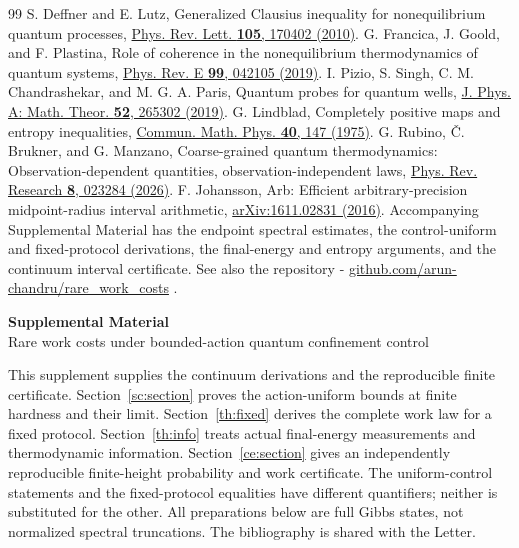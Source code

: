 \documentclass[aps,prl,reprint,superscriptaddress,longbibliography]{revtex4-2}
\begin{document}
\begin{thebibliography}{99}
S. Deffner and E. Lutz,
Generalized Clausius inequality for nonequilibrium quantum processes,
\href{https://doi.org/10.1103/PhysRevLett.105.170402}{Phys. Rev. Lett. \textbf{105}, 170402 (2010)}.
G. Francica, J. Goold, and F. Plastina,
Role of coherence in the nonequilibrium thermodynamics of quantum systems,
\href{https://doi.org/10.1103/PhysRevE.99.042105}{Phys. Rev. E \textbf{99}, 042105 (2019)}.
I. Pizio, S. Singh, C. M. Chandrashekar, and M. G. A. Paris,
Quantum probes for quantum wells,
\href{https://doi.org/10.1088/1751-8121/ab1eda}{J. Phys. A: Math. Theor. \textbf{52}, 265302 (2019)}.
G. Lindblad,
Completely positive maps and entropy inequalities,
\href{https://doi.org/10.1007/BF01609396}{Commun. Math. Phys. \textbf{40}, 147 (1975)}.
G. Rubino, \v C. Brukner, and G. Manzano,
Coarse-grained quantum thermodynamics: Observation-dependent quantities, observation-independent laws,
\href{https://doi.org/10.1103/gcyn-18tv}{Phys. Rev. Research \textbf{8}, 023284 (2026)}.
F. Johansson,
Arb: Efficient arbitrary-precision midpoint-radius interval arithmetic,
\href{https://arxiv.org/abs/1611.02831}{arXiv:1611.02831 (2016)}.
Accompanying Supplemental Material has the endpoint spectral estimates, the control-uniform and fixed-protocol derivations, the final-energy and entropy arguments, and the continuum interval certificate. See also the repository - 
\href{https://github.com/arun-chandru/rare_work_costs}{github.com/arun-chandru/rare\_work\_costs}
.
\end{thebibliography}


\clearpage
\onecolumngrid
\setcounter{section}{0}
\setcounter{equation}{0}
\renewcommand{\thesection}{S\arabic{section}}
\renewcommand{\thesubsection}{\thesection.\arabic{subsection}}
\renewcommand{\theequation}{S\arabic{section}.\arabic{equation}}
\setcounter{secnumdepth}{2}
\setlength{\emergencystretch}{2em}
\begin{center}
{\large\bfseries Supplemental Material}\\[5pt]
{\large Rare work costs under bounded-action quantum confinement control}
\end{center}
\bigskip
\noindent

This supplement supplies the continuum derivations and the reproducible
finite certificate. Section~\ref{sc:section} proves the action-uniform
bounds at finite hardness and their limit. Section~\ref{th:fixed}
derives the complete work law for a fixed protocol.
Section~\ref{th:info} treats actual final-energy measurements and
thermodynamic information. Section~\ref{ce:section} gives an independently
reproducible finite-height probability and work certificate.
The uniform-control statements and the fixed-protocol equalities have
different quantifiers; neither is substituted for the other.
All preparations below are full Gibbs states, not normalized spectral
truncations. The bibliography is shared with the Letter.
\end{document}

